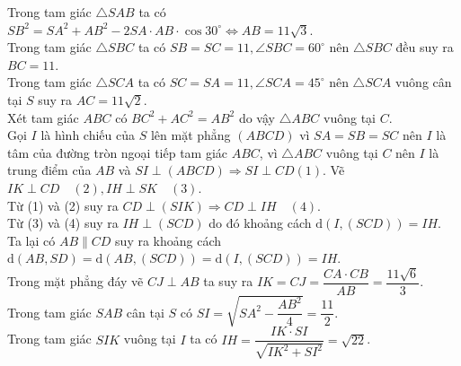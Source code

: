 \begin{ex}
{\begin{center}
		\end{center}
		Trong tam giác $\triangle SAB$ ta có $SB^2=SA^2+AB^2-2SA\cdot AB\cdot\cos 30^{\circ}\Leftrightarrow AB=11\sqrt{3}$.\\
		Trong tam giác $\triangle SBC$ ta có $SB=SC=11,\angle SBC=60^{\circ}$ nên $\triangle SBC$ đều suy ra $BC=11$.\\
		Trong tam giác $\triangle SCA$ ta có $SC=SA=11,\angle SCA=45^{\circ}$ nên $\triangle SCA$ vuông cân tại $S$ suy ra $AC=11\sqrt{2}$.\\
		Xét tam giác $ABC$ có $BC^2+AC^2=AB^2$ do vậy $\triangle ABC$ vuông tại $C$.\\
		Gọi $I$ là hình chiếu của $S$ lên mặt phẳng $(ABCD)$ vì $SA=SB=SC$ nên $I$ là tâm của đường tròn ngoại tiếp tam giác $ABC$, vì $\triangle ABC$ vuông tại $C$ nên $I$ là trung điểm của $AB$ và $SI\perp (ABCD)\Rightarrow SI\perp CD (1)$. Vẽ $IK\perp CD\quad  (2),IH\perp SK \quad(3)$.\\
		Từ (1) và (2) suy ra $CD\perp (SIK)\Rightarrow CD\perp IH \quad(4)$.\\
		Từ (3) và (4) suy ra $IH\perp (SCD)$ do đó khoảng cách $\mathrm{d}(I,(SCD))=IH$.\\
		Ta lại có $AB\parallel CD$ suy ra khoảng cách $\mathrm{d}(AB,SD)=\mathrm{d}(AB,(SCD))=\mathrm{d}(I,(SCD))=IH$.\\
		Trong mặt phẳng đáy vẽ $CJ\perp AB$ ta suy ra $IK=CJ=\dfrac{CA\cdot CB}{AB}=\dfrac{11\sqrt{6}}{3}$.\\
		Trong tam giác $SAB$ cân tại $S$ có $SI=\sqrt{SA^2-\dfrac{AB^2}{4}}=\dfrac{11}{2}$.\\
		Trong tam giác $SIK$ vuông tại $I$ ta có $IH=\dfrac{IK\cdot SI}{\sqrt{IK^2+SI^2}}=\sqrt{22}$.}
\end{ex}

